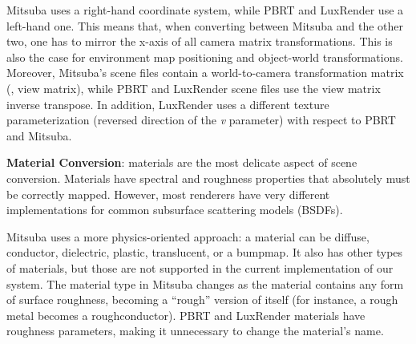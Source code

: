 Mitsuba uses a right-hand coordinate system, while PBRT and LuxRender use a
left-hand one. This means that, when converting between Mitsuba and the other
two, one has to mirror the x-axis of all camera matrix transformations. This is
also the case for environment map positioning and object-world
transformations. Moreover, Mitsuba's scene files contain a world-to-camera transformation matrix (\ie, view matrix),
while PBRT and LuxRender scene files use the view matrix inverse transpose.
In addition, LuxRender uses a different texture parameterization (reversed direction of the \emph{v} parameter) with respect to PBRT and Mitsuba.



\textbf{Material Conversion}: 
materials are the most delicate aspect of scene conversion. Materials have
spectral and roughness properties that absolutely must be correctly mapped. 
However, most renderers have very different implementations
for common subsurface scattering models (BSDFs).

Mitsuba uses a more physics-oriented approach: a material can be diffuse,
conductor, dielectric, plastic, translucent, or a bumpmap.
It also has other types of materials, but those are not supported in the current implementation of our system.
The material type in Mitsuba changes as the material contains any form of
surface roughness, becoming a ``rough'' version of itself (for instance, a rough
metal becomes a roughconductor).
%
PBRT and LuxRender materials have roughness parameters, making it unnecessary to
change the material's name.

